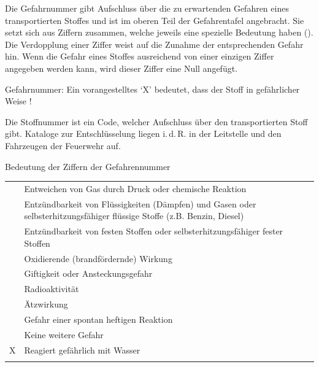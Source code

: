 {\label{topic:gefahrnummer}
Die Gefahrnummer gibt Aufschluss über die zu erwartenden
Gefahren eines transportierten Stoffes und ist im oberen
Teil der Gefahrentafel angebracht. Sie setzt sich aus
Ziffern zusammen, welche jeweils eine spezielle Bedeutung
haben (). Die Verdopplung
einer Ziffer weist auf die Zunahme der entsprechenden Gefahr
hin. Wenn die Gefahr eines Stoffes ausreichend von einer
einzigen Ziffer angegeben werden kann, wird dieser Ziffer
eine Null angefügt. 

\begin{Danger}
  \item Gefahrnummer: Ein vorangestelltes \enquote*{X} bedeutet,
  dass der Stoff in  gefährlicher Weise
  !
  
\end{Danger}

% 

}
{}
{}
{}
{}



{Die Stoffnummer ist ein Code, welcher Aufschluss über den
transportierten Stoff gibt. Kataloge zur Entschlüsselung
liegen i.\,d.\,R. in der Leitstelle und den Fahrzeugen der
Feuerwehr auf.

}
{}
{}
{}
{}



\Table
{Bedeutung der
Ziffern der Gefahrennummer}%
{}%
{\label{tab:gefahrennummer}}%
{}%
{}%
{%
\begin{tabulary}{\linewidth}{cL}
\addlinespace\toprule{} & Entweichen von Gas durch Druck oder chemische Reaktion
\\ & Entzündbarkeit von Flüssigkeiten (Dämpfen) und Gasen oder 
selbsterhitzungsfähiger flüssige
Stoffe (z.B. Benzin, Diesel)
\\ & Entzündbarkeit von festen Stoffen oder
selbsterhitzungsfähiger fester Stoffen
\\ & Oxidierende (brandfördernde) Wirkung
\\ & Giftigkeit oder Ansteckungsgefahr
\\ & Radioaktivität
\\ & \"Atzwirkung
\\ & Gefahr einer spontan heftigen Reaktion
\\ & Keine weitere Gefahr
\\\addlinespace
 {\sffamily X} & Reagiert gefährlich mit Wasser
\\\addlinespace\bottomrule
\end{tabulary}
}%
{}%



